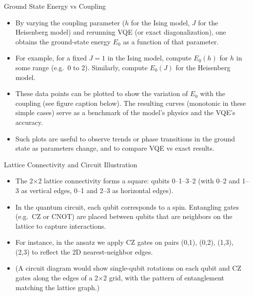 \documentclass{beamer}
\begin{document}
\begin{frame}{Ground State Energy vs Coupling}
\begin{itemize}
\item By varying the coupling parameter ($h$ for the Ising model, $J$ for the Heisenberg model) and rerunning VQE (or exact diagonalization), one obtains the ground-state energy $E_0$ as a function of that parameter.
\item For example, for a fixed $J=1$ in the Ising model, compute $E_0(h)$ for $h$ in some range (e.g.\ $0$ to $2$). Similarly, compute $E_0(J)$ for the Heisenberg model.
\item These data points can be plotted to show the variation of $E_0$ with the coupling (see figure caption below). The resulting curves (monotonic in these simple cases) serve as a benchmark of the model’s physics and the VQE’s accuracy.
\item Such plots are useful to observe trends or phase transitions in the ground state as parameters change, and to compare VQE vs exact results.
\end{itemize}
\end{frame}

\begin{frame}{Lattice Connectivity and Circuit Illustration}
\begin{itemize}
\item The 2×2 lattice connectivity forms a square: qubits 0–1–3–2 (with 0–2 and 1–3 as vertical edges, 0–1 and 2–3 as horizontal edges).
\item In the quantum circuit, each qubit corresponds to a spin. Entangling gates (e.g.\ CZ or CNOT) are placed between qubits that are neighbors on the lattice to capture interactions.
\item For instance, in the ansatz we apply CZ gates on pairs (0,1), (0,2), (1,3), (2,3) to reflect the 2D nearest-neighbor edges.
\item (A circuit diagram would show single-qubit rotations on each qubit and CZ gates along the edges of a 2×2 grid, with the pattern of entanglement matching the lattice graph.)
\end{itemize}
\end{frame}
\end{document}
